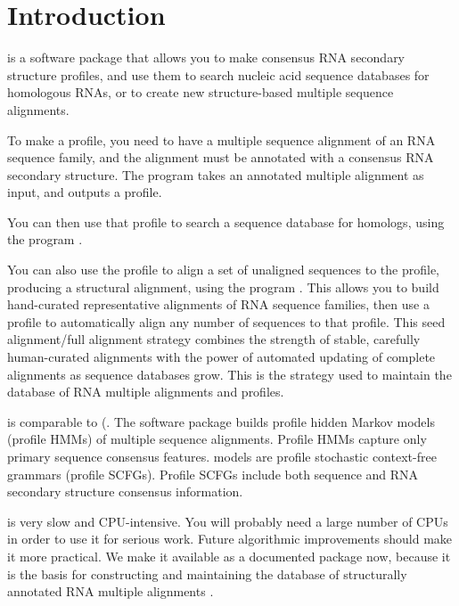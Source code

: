\section{Introduction}

 is a software package that allows you to make
consensus RNA secondary structure profiles, and use them to search
nucleic acid sequence databases for homologous RNAs, or to create new
structure-based multiple sequence alignments.

To make a profile, you need to have a multiple sequence alignment of
an RNA sequence family, and the alignment must be annotated with a
consensus RNA secondary structure. The program  takes an
annotated multiple alignment as input, and outputs a profile.

You can then use that profile to search a sequence database for homologs,
using the program .

You can also use the profile to align a set of unaligned sequences to
the profile, producing a structural alignment, using the program
. This allows you to build hand-curated representative
alignments of RNA sequence families, then use a profile to
automatically align any number of sequences to that profile.  This
seed alignment/full alignment strategy combines the strength of
stable, carefully human-curated alignments with the power of automated
updating of complete alignments as sequence databases grow. This is
the strategy used to maintain the  database of RNA
multiple alignments and profiles.

 is comparable to 
(.  The
 software package builds profile hidden Markov models
(profile HMMs) of multiple sequence alignments. Profile HMMs capture
only primary sequence consensus features.  models
are profile stochastic context-free grammars (profile SCFGs).  Profile
SCFGs include both sequence and RNA secondary structure consensus
information.

 is very slow and CPU-intensive. You will probably
need a large number of CPUs in order to use it for serious
work. Future algorithmic improvements should make it more practical.
We make it available as a documented package now, because it is the
basis for constructing and maintaining the  database of
structurally annotated RNA multiple alignments
\cite{Griffiths-Jones03}.










